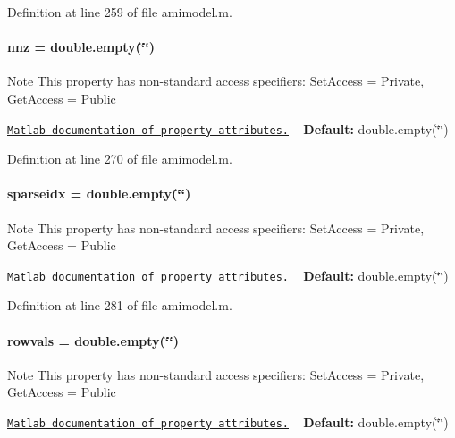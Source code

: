 Definition at line 259 of file amimodel.\+m.

\hypertarget{classamimodel_a825ec588729c090ff51ea3473dcbc6b9}{}
\paragraph[{nnz}]{\setlength{\rightskip}{0pt plus 5cm}nnz = double.\+empty(\char`\"{}\char`\"{})}\label{classamimodel_a825ec588729c090ff51ea3473dcbc6b9}
\begin{DoxyNote}{Note}
This property has non-\/standard access specifiers\+: {\ttfamily Set\+Access = Private, Get\+Access = Public} 

\href{http://www.mathworks.com/help/matlab/matlab_oop/property-attributes.html}{\tt Matlab documentation of property attributes.} ~\newline
{\bfseries Default\+:} double.\+empty(\char`\"{}\char`\"{}) 
\end{DoxyNote}


Definition at line 270 of file amimodel.\+m.

\hypertarget{classamimodel_a6ffb112eda9ff756e17104210981b30b}{}
\paragraph[{sparseidx}]{\setlength{\rightskip}{0pt plus 5cm}sparseidx = double.\+empty(\char`\"{}\char`\"{})}\label{classamimodel_a6ffb112eda9ff756e17104210981b30b}
\begin{DoxyNote}{Note}
This property has non-\/standard access specifiers\+: {\ttfamily Set\+Access = Private, Get\+Access = Public} 

\href{http://www.mathworks.com/help/matlab/matlab_oop/property-attributes.html}{\tt Matlab documentation of property attributes.} ~\newline
{\bfseries Default\+:} double.\+empty(\char`\"{}\char`\"{}) 
\end{DoxyNote}


Definition at line 281 of file amimodel.\+m.

\hypertarget{classamimodel_aa0abea3560da3f409a28567f42d52872}{}
\paragraph[{rowvals}]{\setlength{\rightskip}{0pt plus 5cm}rowvals = double.\+empty(\char`\"{}\char`\"{})}\label{classamimodel_aa0abea3560da3f409a28567f42d52872}
\begin{DoxyNote}{Note}
This property has non-\/standard access specifiers\+: {\ttfamily Set\+Access = Private, Get\+Access = Public} 

\href{http://www.mathworks.com/help/matlab/matlab_oop/property-attributes.html}{\tt Matlab documentation of property attributes.} ~\newline
{\bfseries Default\+:} double.\+empty(\char`\"{}\char`\"{}) 
\end{DoxyNote}



